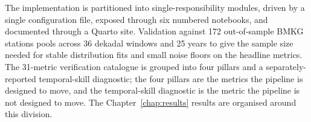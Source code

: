 The implementation is partitioned into
single-responsibility modules, driven by a single configuration
file, exposed through six numbered notebooks, and documented
through a Quarto site. Validation against 172 out-of-sample BMKG stations
pools across 36 dekadal windows and 25 years to give the sample
size needed for stable distribution fits and small noise floors
on the headline metrics. The 31-metric verification catalogue is
grouped into four pillars and a separately-reported temporal-skill
diagnostic; the four pillars are the metrics the pipeline is
designed to move, and the temporal-skill diagnostic is the metric
the pipeline is not designed to move. The Chapter~\ref{chap:results}
results are organised around this division.
